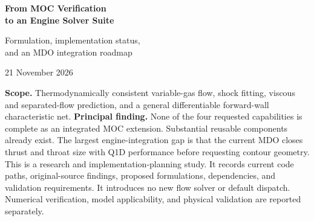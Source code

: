 \documentclass[11pt,letterpaper]{article}
\numberwithin{equation}{section}
\begin{document}
\begin{titlepage}
\vspace*{0.8cm}
{\Huge\sffamily\bfseries\color{ink}From MOC Verification\\[0.15cm]to an Engine Solver Suite\par}
\vspace{0.8cm}
{\Large\sffamily\color{teal}Formulation, implementation status,\\and an MDO integration roadmap\par}
\vspace{0.8cm}
21 November 2026\par
\vspace{1cm}
\textbf{Scope.} Thermodynamically consistent variable-gas flow, shock fitting,
viscous and separated-flow prediction, and a general differentiable
forward-wall characteristic net.
\vspace{0.4cm}
\textbf{Principal finding.} None of the four requested capabilities is complete
as an integrated MOC extension. Substantial reusable components already exist.
The largest engine-integration gap is that the current MDO closes thrust and
throat size with Q1D performance before requesting contour geometry.
\vfill
This is a research and implementation-planning study. It records current code
paths, original-source findings, proposed formulations, dependencies, and
validation requirements. It introduces no new flow solver or default dispatch.
Numerical verification, model applicability, and physical validation are
reported separately.
\end{titlepage}
\tableofcontents
\clearpage






\end{document}
